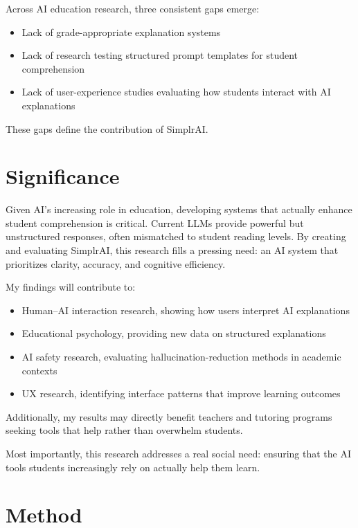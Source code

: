 \documentclass[11pt]{article}
\begin{document}
Across AI education research, three consistent gaps emerge:

\begin{itemize}[leftmargin=1.6em]
  \item Lack of grade-appropriate explanation systems
  \item Lack of research testing structured prompt templates for student
  comprehension
  \item Lack of user-experience studies evaluating how students interact with
  AI explanations
\end{itemize}

These gaps define the contribution of SimplrAI.

\section*{Significance}

Given AI's increasing role in education, developing systems that actually
enhance student comprehension is critical. Current LLMs provide powerful but
unstructured responses, often mismatched to student reading levels. By creating
and evaluating SimplrAI, this research fills a pressing need: an AI system that
prioritizes clarity, accuracy, and cognitive efficiency.

My findings will contribute to:

\begin{itemize}[leftmargin=1.6em]
  \item Human--AI interaction research, showing how users interpret AI
  explanations
  \item Educational psychology, providing new data on structured explanations
  \item AI safety research, evaluating hallucination-reduction methods in
  academic contexts
  \item UX research, identifying interface patterns that improve learning
  outcomes
\end{itemize}

Additionally, my results may directly benefit teachers and tutoring programs
seeking tools that help rather than overwhelm students.

Most importantly, this research addresses a real social need: ensuring that the
AI tools students increasingly rely on actually help them learn.

\section*{Method}
\end{document}

